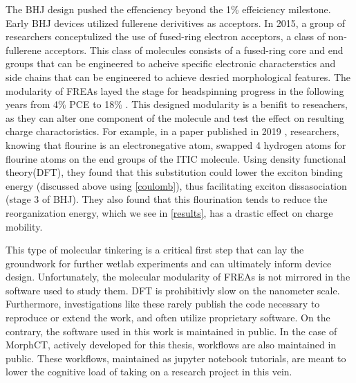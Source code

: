 The BHJ design pushed the effenciency beyond the 1\% effeiciency milestone. Early BHJ devices utilized
fullerene derivitives as acceptors. In 2015, a group of researchers conceptulized the use of
fused-ring electron acceptors, a class of non-fullerene acceptors. This class of molecules consists of
a fused-ring core and end groups that can be engineered to acheive specific electronic characterstics and side
chains that can be engineered to achieve desried morphological features. The modularity of FREAs
layed the stage for headspinning progress in the following years from 4\% PCE to 18\% \cite{Wang2021a}. 
This designed modularity is a benifit to reseachers, as they can alter one component of the molecule and test
the effect on resulting charge charactoristics. For example, in a paper published in 2019 \cite{Benatto2019},
researchers, knowing that flourine is an electronegative atom, swapped 4 hydrogen atoms for flourine atoms on
the end groups of the ITIC molecule. Using density functional theory(DFT), they found 
that this substitution could lower the exciton
binding energy (discussed above using \autoref{coulomb}), thus facilitating exciton dissasociation (stage 3 of
BHJ). They also found
that this flourination tends to reduce the reorganization energy, which we see in \autoref{results}, has a
drastic effect on charge mobility.

This type of molecular tinkering is a critical first step that can lay the groundwork for further wetlab
experiments and can ultimately inform device design. Unfortunately, the molecular modularity of FREAs is not
mirrored in the software used to study them. DFT is prohibitivly slow on the nanometer
scale. Furthermore, investigations like these rarely publish the code necessary to reproduce or extend the
work, and often utilize proprietary software. On the contrary, the software used in this 
work is maintained in public. In the
case of MorphCT, actively developed for this thesis, workflows are
also maintained in public. These workflows, maintained as jupyter notebook tutorials, 
are meant to lower the cognitive load of taking on a research project in this vein. 


